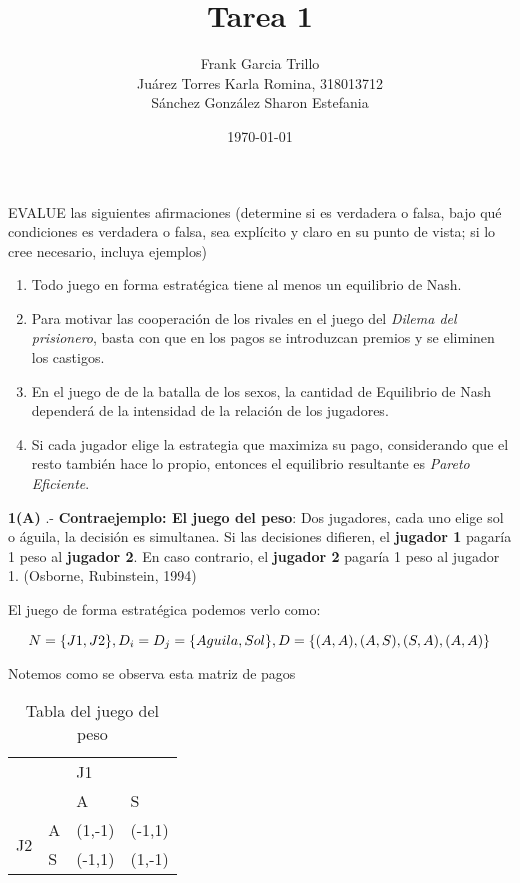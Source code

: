 \documentclass{homework}
\author{Frank Garcia Trillo\\
Juárez Torres Karla Romina,   318013712\\
Sánchez González Sharon Estefania}
\date{\today}
\title{Tarea 1}
\begin{document}
 \maketitle


\question EVALUE las siguientes afirmaciones (determine si es verdadera o falsa, bajo qué condiciones es verdadera o falsa, sea explícito y claro en su punto de vista; si lo cree necesario, incluya ejemplos)

\begin{enumerate}
    \item Todo juego en forma estratégica tiene al menos un equilibrio de Nash.
    \item Para motivar las cooperación de los rivales en el juego del \textit{Dilema del prisionero}, basta con que en los pagos se introduzcan premios y se eliminen los castigos.
    \item En el juego de de la batalla de los sexos, la cantidad de Equilibrio de Nash dependerá de la intensidad de la relación de los jugadores.
    \item Si cada jugador elige la estrategia que maximiza su pago, considerando que el resto también hace lo propio, entonces el equilibrio resultante es \textit{Pareto Eficiente}.
\end{enumerate}


\textbf{1(A)} .- \textbf{Contraejemplo: El juego del peso}:
Dos jugadores, cada uno elige sol o águila, la decisión es simultanea. Si las decisiones difieren, el \textbf{jugador 1} pagaría 1 peso al \textbf{jugador 2}. En caso contrario, el \textbf{jugador 2} pagaría 1 peso al jugador 1. (Osborne, Rubinstein, 1994)

El juego de forma estratégica podemos verlo como:

\begin{equation}
    N = \{ J1, J2 \},  \\
    D_i = D_j = \{ Aguila, Sol \},  \\
    D = \{ (A,A), (A,S), (S,A), (A,A) \} 
\end{equation}

Notemos como se observa esta matriz de pagos
    

\begin{table}[h!]
\begin{tabular}{|ll|ll|}
\hline
\multicolumn{2}{|l|}{\multirow{2}{*}{}} & \multicolumn{2}{l|}{J1} \\ \cline{3-4} 
\multicolumn{2}{|l|}{} & \multicolumn{1}{l|}{A} & S \\ \hline
\multicolumn{1}{|c|}{\multirow{2}{*}{J2}} & A & \multicolumn{1}{l|}{(1,-1)} & (-1,1) \\ \cline{2-4} 
\multicolumn{1}{|c|}{} & S & \multicolumn{1}{l|}{(-1,1)} & (1,-1) \\ \hline
\end{tabular}
\caption{Tabla del juego del peso}
\end{table}
\end{document}

